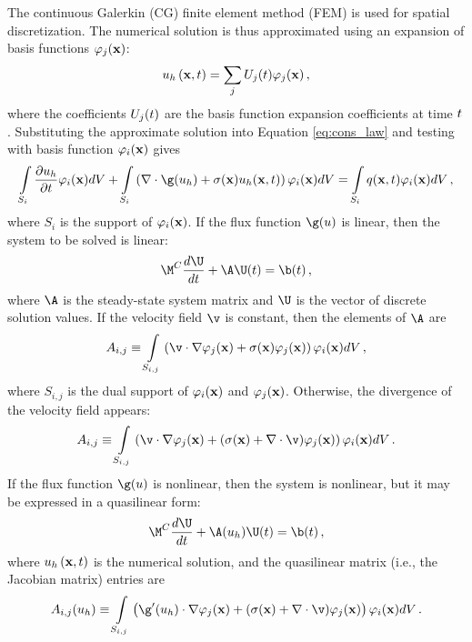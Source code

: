 The continuous Galerkin (CG) finite element method (FEM) is used for spatial
discretization.  The numerical solution is thus approximated using an
expansion of basis functions $\varphi_j(\mathbf{x})$:
\begin{equation}
   u_h\left(\mathbf{x},t\right) = \sum\limits_j U_j(t)
   \varphi_j(\mathbf{x}) \,,
\end{equation}
where the coefficients $U_j(t)$ are the basis function
expansion coefficients at time $t$. Substituting the approximate
solution into Equation \eqref{eq:cons_law} and testing with basis function
$\varphi_i(\mathbf{x})$ gives
\begin{equation}
   \int\limits_{S_i}\pd{u_h}{t}\testfunction_i(\x) d\volume
      + \int\limits_{S_i}\left(\nabla\cdot\g(u_h)
      + \sigma(\x)u_h(\x,t)\right)\varphi_i(\x) d\volume
      = \int\limits_{S_i} q(\x,t) \varphi_i(\x) d\volume \eqc
\end{equation}
where $S_i$ is the support of $\varphi_i(\mathbf{x})$. If the flux function
$\g(u)$ is linear, then the system to be solved is linear:
\begin{equation}\label{semidiscrete}
   \M^C\frac{d\U}{dt}+\A \U(t) = \b(t) \eqc
\end{equation}
where $\A$ is the steady-state system matrix and $\U$ is the
vector of discrete solution values. If the velocity field $\v$ is
constant, then the elements of $\A$ are
\begin{equation}\label{Aij}
A_{i,j} \equiv \int\limits_{S_{i,j}}\left(
   \v\cdot\nabla\varphi_j(\x) +
   \sigma(\x)\varphi_j(\x)\right)\varphi_i(\x) dV \eqc
\end{equation}
where $S_{i,j}$ is the dual support of $\varphi_i(\mathbf{x})$ and $\varphi_j(\mathbf{x})$.
Otherwise, the divergence of the velocity field appears:
\begin{equation}\label{eq:Aij_nonconstant_v}
A_{i,j} \equiv \int\limits_{S_{i,j}}\left(
   \v\cdot\nabla\varphi_j(\x) +
   (\sigma(\x)+\nabla\cdot\v)\varphi_j(\x)\right)\varphi_i(\x) dV \eqp
\end{equation}
If the flux function $\g(u)$ is nonlinear, then the system is
nonlinear, but it may be expressed in a quasilinear form:
\begin{equation}\label{eq:semi_quasilinear}
   \M^C\frac{d\U}{dt}+\A(u_h) \U(t) = \b(t) \eqc
\end{equation}
where $u_h\left(\mathbf{x},t\right)$ is the numerical solution, and the quasilinear
matrix (i.e., the Jacobian matrix) entries are
\begin{equation}\label{eq:Aij_nonlinear}
A_{i,j}(u_h) \equiv \int\limits_{S_{i,j}}\left(
   \g'(u_h)\cdot\nabla\varphi_j(\x) +
   (\sigma(\x)+\nabla\cdot\v)\varphi_j(\x)\right)\varphi_i(\x) dV \eqp
\end{equation}
